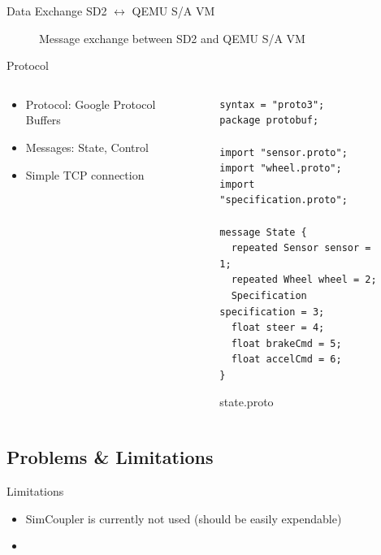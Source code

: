 \documentclass[aspectratio=169]{beamer}
\begin{document}
\begin{frame}{Data Exchange SD2 $\longleftrightarrow$ QEMU S/A VM}
  \begin{figure}
    \caption{\tiny Message exchange between SD2 and QEMU S/A VM}
  \end{figure}
\end{frame}

\begin{frame}[fragile]{Protocol}
  \begin{columns}
    \begin{column}{0.5\textwidth}
      \begin{itemize}
        \item Protocol: Google Protocol Buffers
        \item Messages: State, Control
        \item Simple TCP connection
      \end{itemize}
    \end{column}
    \begin{column}{0.5\textwidth}
      \begin{figure}
        \begin{verbatim}
syntax = "proto3";
package protobuf;

import "sensor.proto";
import "wheel.proto";
import "specification.proto";

message State {
  repeated Sensor sensor = 1;
  repeated Wheel wheel = 2;
  Specification specification = 3;
  float steer = 4;
  float brakeCmd = 5;
  float accelCmd = 6;
}
        \end{verbatim}
        \caption{\tiny state.proto}
      \end{figure}
    \end{column}
  \end{columns}
\end{frame}

\subsection{Problems \& Limitations}
\begin{frame}{Limitations}
  \begin{itemize}
    \item SimCoupler is currently not used (should be easily expendable)
    \item
  \end{itemize}
\end{frame}
\end{document}
